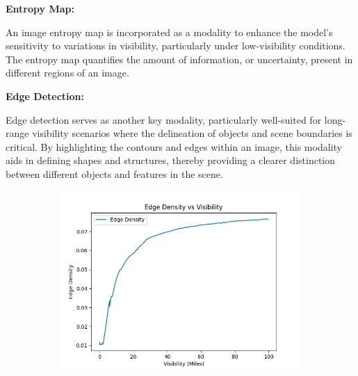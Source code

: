 \textbf{Entropy Map:}

An image entropy map is incorporated as a modality to enhance the model's sensitivity to variations in visibility, particularly under low-visibility conditions. The entropy map quantifies the amount of information, or uncertainty, present in different regions of an image.

\textbf{Edge Detection:}

Edge detection serves as another key modality, particularly well-suited for long-range visibility scenarios where the delineation of objects and scene boundaries is critical. By highlighting the contours and edges within an image, this modality aids in defining shapes and structures, thereby providing a clearer distinction between different objects and features in the scene.


\begin{figure}
    \centering
    \begin{subfigure}[b]{0.4\textwidth}
        \includegraphics[width=\textwidth]{imgs/edge_density_vs_visibility.png}
    

\end{subfigure}
\end{figure}
